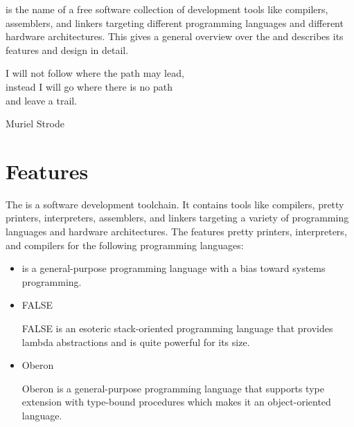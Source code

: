 





{\emph{\ecs{}} is the name of a free software collection of development tools like
compilers, assemblers, and linkers targeting different programming languages and different hardware architectures.
This \documentation{} gives a general overview over the \ecs{} and describes its features and design in detail.}

\epigraph{I will not follow where the path may lead, \\ instead I will go where there is no path \\ and leave a trail.}{Muriel Strode}

\section{Features}

The \ecs{} is a software development toolchain.
It contains tools like compilers, pretty printers, interpreters, assemblers, and linkers targeting a variety of programming languages and hardware architectures.
The \ecs{} features pretty printers, interpreters, and compilers for the following programming languages:

\begin{center}\cpplogo{1em}\fallogo{1em}\oblogo{2em}\end{center}

\begin{itemize}

\item \cpp{}\nopagebreak

\cpp{} is a general-purpose programming language with a bias toward systems programming.
\seecpp

\item FALSE\nopagebreak

FALSE is an esoteric stack-oriented programming language that provides lambda abstractions and is quite powerful for its size.
\seefalse

\item Oberon\nopagebreak

Oberon is a general-purpose programming language that supports type extension with type-bound procedures which makes it an object-oriented language.
\seeoberon

\end{itemize}


